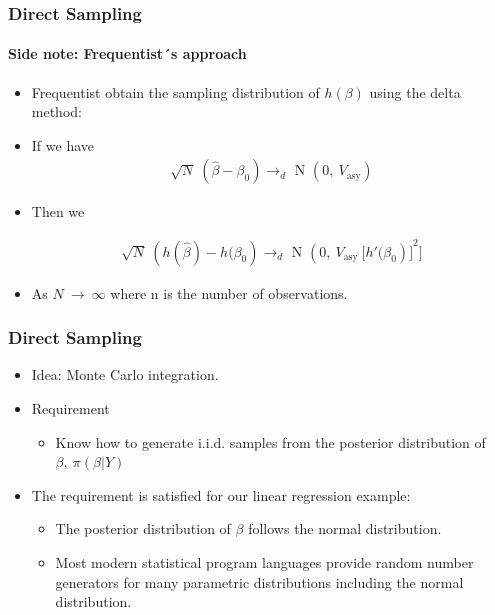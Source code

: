 \documentclass[
  shownotes,
  xcolor={svgnames},
  hyperref={colorlinks,citecolor=DarkBlue,linkcolor=DarkRed,urlcolor=DarkBlue}
  , aspectratio=169]{beamer}
\begin{document}
\begin{frame}[fragile]
\frametitle{Direct Sampling}
\framesubtitle{Side note: Frequentist´s approach}

\begin{itemize}
\item Frequentist obtain the sampling distribution of $h\left( \beta \right)$ using the delta method:
\medskip
\item If we have
\medskip
\begin{align}
\sqrt{N}\ \left( \widehat{\beta} - \beta_{0} \right) \rightarrow_{d}\text{\ N\ }\left( 0,\ V_{\text{asy}} \right)
\end{align}

\medskip
\item  Then we

\begin{align}
\sqrt{N}\ \left( h\left( \widehat{\beta} \right) - h(\beta_{0} \right) \rightarrow_{d}\text{\ N\ }{\left( 0,\ V_{\text{asy}}\ \lbrack h'(\beta_{0} \right)\rbrack}^{2}]
\end{align}

\item As $N\  \rightarrow \ \infty$ where n is the number of observations.
\end{itemize}
\end{frame}
\begin{frame}[fragile]
\frametitle{Direct Sampling}

\begin{itemize}

\item Idea: Monte Carlo integration.
\medskip
\item Requirement
\medskip
    \begin{itemize}
        \item Know how to generate $\text{i.i.d.}$ samples from the posterior distribution of $\beta,\ \pi(\beta|Y)$
    \end{itemize}
    \medskip
    \item The requirement is satisfied for our linear regression example:
    \medskip
    \begin{itemize}
        \item The posterior distribution of $\beta$ follows the normal distribution.
    \medskip
        \item Most modern statistical program languages provide random number generators for many parametric distributions including the normal distribution.
    \end{itemize}
\end{itemize}

\end{frame}
\end{document}

